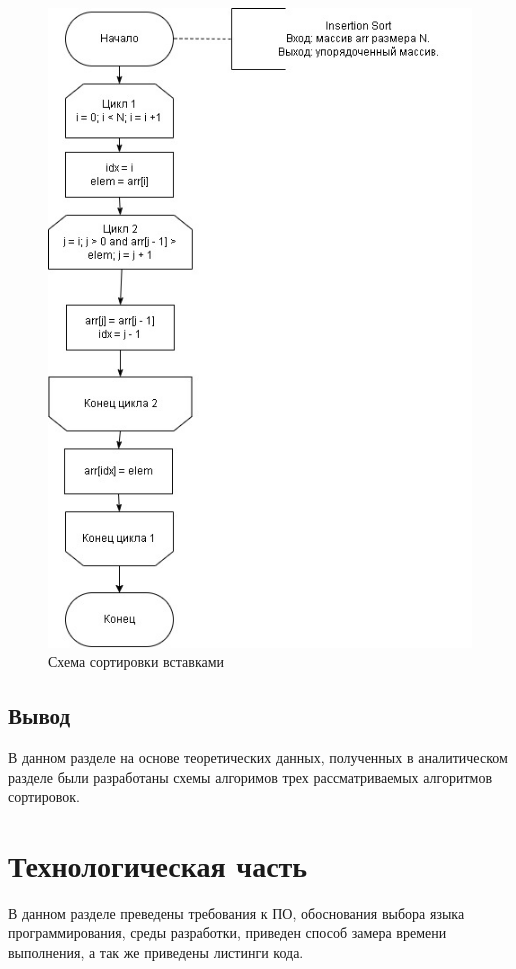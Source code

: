 \documentclass[a4paper,12pt]{report}
\begin{document}
	\begin{figure}[h]
		\centering
		\includegraphics[width=0.9\linewidth]{insertion}
		\caption{Схема сортировки вставками}
		\label{fig:schema_insertion}
	\end{figure}
	
	\section{Вывод}
	
	В данном разделе на основе теоретических данных, полученных в аналитическом разделе были разработаны схемы алгоримов трех рассматриваемых алгоритмов сортировок.
	
	\chapter{Технологическая часть}
	
	В данном разделе преведены требования к ПО, обоснования выбора языка программирования, среды разработки, приведен способ замера времени выполнения, а так же приведены листинги кода.
	
\end{document}
